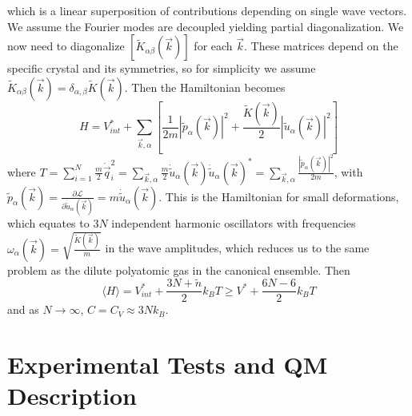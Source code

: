 \documentclass[12pt, a4paper, oneside, openright, titlepage]{book}
\begin{document}
which is a linear superposition of contributions depending on single wave vectors. We assume the Fourier modes are decoupled yielding partial diagonalization. We now need to diagonalize $[\tilde{K}_{\alpha\beta}(\vec{k})]$ for each $\vec{k}$. These matrices depend on the specific crystal and its symmetries, so for simplicity we assume $\tilde{K}_{\alpha\beta}(\vec{k}) = \delta_{\alpha,\beta}\tilde{K}(\vec{k})$. Then the Hamiltonian becomes \begin{equation*}
    H = V_{int}^* + \sum_{\vec{k},\alpha}\left[\frac{1}{2m}|\tilde{p}_{\alpha}(\vec{k})|^2 + \frac{\tilde{K}(\vec{k})}{2}|\tilde{u}_{\alpha}(\vec{k})|^2\right] 
\end{equation*}
where $T = \sum_{i=1}^N\frac{m}{2}\dot{\vec{q}}_i^2 = \sum_{\vec{k},\alpha}\frac{m}{2}\dot{\tilde{u}}_{\alpha}(\vec{k})\dot{\tilde{u}}_{\alpha}(\vec{k})^* = \sum_{\vec{k},\alpha}\frac{|\tilde{p}_{\alpha}(\vec{k})|^2}{2m}$, with $\tilde{p}_{\alpha}(\vec{k}) = \frac{\partial \mathcal{L}}{\partial \dot{\tilde{u}}_{\alpha}(\vec{k})} = m\dot{\tilde{u}}_{\alpha}(\vec{k})$. This is the Hamiltonian for small deformations, which equates to $3N$ independent harmonic oscillators with frequencies $\omega_{\alpha}(\vec{k}) = \sqrt{\frac{\tilde{K}(\vec{k})}{m}}$ in the wave amplitudes, which reduces us to the same problem as the dilute polyatomic gas in the canonical ensemble. Then \begin{equation*}
    \langle H\rangle = V_{int}^*+\frac{3N+\tilde{n}}{2}k_BT \geq V^* + \frac{6N-6}{2}k_BT
\end{equation*}
and as $N\rightarrow \infty$, $C = C_V \approx 3Nk_B$.


\section{Experimental Tests and QM Description}
\end{document}
